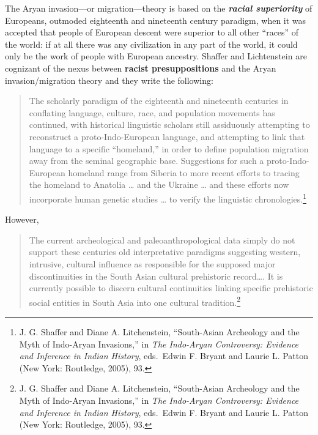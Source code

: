 \noindent
The Aryan invasion—or migration—theory is based on the \textbf{\textit{racial superiority}} of Europeans, outmoded eighteenth and nineteenth century paradigm, when it was accepted that people of European descent were superior to all other “races” of the world: if at all there was any civilization in any part of the world, it could only be the work of people with European ancestry. Shaffer and Lichtenstein are cognizant of the nexus between \textbf{racist presuppositions} and the Aryan invasion/migration theory and they write the following: 

\begin{quote}
The scholarly paradigm of the eighteenth and nineteenth centuries in conflating language, culture, race, and population movements has continued, with historical linguistic scholars still assiduously attempting to reconstruct a proto-Indo-European language, and attempting to link that language to a specific “homeland,” in order to define population migration away from the seminal geographic base. Suggestions for such a proto-Indo-European homeland range from Siberia to more recent efforts to tracing the homeland to Anatolia … and the Ukraine … and these efforts now incorporate human genetic studies … to verify the linguistic chronologies.\footnote{J. G. Shaffer and Diane A. Litchenstein, “South-Asian Archeology and 	the Myth of Indo-Aryan Invasions,” in \textit{The Indo-Aryan Controversy: Evidence and Inference in Indian History}, eds.\ Edwin F. Bryant and Laurie L. Patton (New York: Routledge, 2005), 93.}
\end{quote}

\noindent
However,

\begin{quote}
The current archeological and paleoanthropological data simply do not support these centuries old interpretative paradigms suggesting western, intrusive, cultural influence as responsible for the supposed major discontinuities in the South Asian cultural prehistoric record…. It is currently possible to discern cultural continuities linking specific prehistoric social entities in South Asia into one cultural tradition.\footnote{J. G. Shaffer and Diane A. Litchenstein, “South-Asian Archeology and the Myth of Indo-Aryan Invasions,” in \textit{The Indo-Aryan Controversy: Evidence and Inference in Indian History}, eds.\ Edwin F. Bryant and Laurie L. Patton (New York: Routledge, 2005), 93.}
\end{quote}

